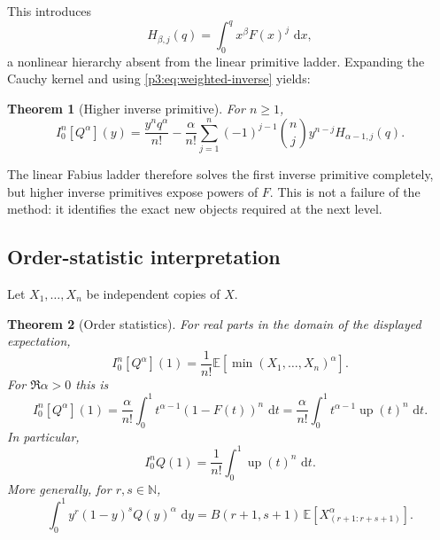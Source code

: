 \documentclass[11pt,oneside]{article}
\newtheorem{theorem}{Theorem}[section]
\theoremstyle{definition}
\theoremstyle{remark}
\newcommand{\Up}{\operatorname{up}}
\newcommand{\E}{\mathbb E}
\newcommand{\N}{\mathbb N}
\newcommand{\dd}{\,\mathrm d}
\newcommand{\1}{\mathbf 1}
\begin{document}
This introduces
\begin{equation}
 H_{\beta,j}(q)=\int_0^qx^\beta F(x)^j\,\dd x,                \label{p3:eq:H-hierarchy}
\end{equation}
a nonlinear hierarchy absent from the linear primitive ladder.  Expanding the Cauchy kernel
and using \eqref{p3:eq:weighted-inverse} yields:

\begin{theorem}[Higher inverse primitive]
\label{p3:thm:inverse-nfold}
For $n\ge1$,
\begin{equation}
 \boxed{
 I_0^n[Q^\alpha](y)
 =\frac{y^nq^\alpha}{n!}
 -\frac{\alpha}{n!}\sum_{j=1}^{n}(-1)^{j-1}\binom nj
 y^{n-j}H_{\alpha-1,j}(q).}
 \label{p3:eq:inverse-nfold}
\end{equation}
\end{theorem}

The linear Fabius ladder therefore solves the first inverse primitive completely, but higher
inverse primitives expose powers of $F$.  This is not a failure of the method: it identifies
the exact new objects required at the next level.

\subsection{Order-statistic interpretation}

Let $X_1,\ldots,X_n$ be independent copies of $X$.

\begin{theorem}[Order statistics]
\label{p3:thm:order-statistics}
For real parts in the domain of the displayed expectation,
\begin{equation}
 I_0^n[Q^\alpha](1)
 =\frac1{n!}\E\left[\min(X_1,\ldots,X_n)^\alpha\right].       \label{p3:eq:min-order}
\end{equation}
For $\Re\alpha>0$ this is
\begin{equation}
 I_0^n[Q^\alpha](1)
 =\frac{\alpha}{n!}\int_0^1t^{\alpha-1}(1-F(t))^n\,\dd t
 =\frac{\alpha}{n!}\int_0^1t^{\alpha-1}\Up(t)^n\,\dd t.    \label{p3:eq:min-survival}
\end{equation}
In particular,
\begin{equation}
 I_0^nQ(1)=\frac1{n!}\int_0^1\Up(t)^n\,\dd t.                \label{p3:eq:inverse-up-power}
\end{equation}
More generally, for $r,s\in\N$,
\begin{equation}
 \int_0^1y^r(1-y)^sQ(y)^\alpha\,\dd y
 =B(r+1,s+1)\,
 \E\left[X_{(r+1:r+s+1)}^\alpha\right].                     \label{p3:eq:beta-order}
\end{equation}
\end{theorem}
\end{document}
